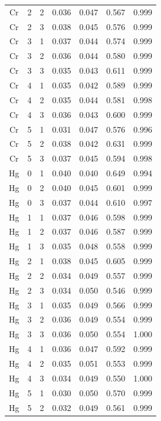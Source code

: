 \documentclass[ms, hidelinks]{uncgdissertationexp}
\theoremstyle{plain}
\theoremstyle{definition}
\theoremstyle{remark}
\begin{document}
\begin{longtable}{ccccccc}
Cr & 2 & 2 & 0.036 & 0.047 & 0.567 & 0.999\\
\rowcolor{gray!6}  Cr & 2 & 3 & 0.038 & 0.045 & 0.576 & 0.999\\
Cr & 3 & 1 & 0.037 & 0.044 & 0.574 & 0.999\\
\rowcolor{gray!6}  Cr & 3 & 2 & 0.036 & 0.044 & 0.580 & 0.999\\
Cr & 3 & 3 & 0.035 & 0.043 & 0.611 & 0.999\\
\rowcolor{gray!6}  Cr & 4 & 1 & 0.035 & 0.042 & 0.589 & 0.999\\
Cr & 4 & 2 & 0.035 & 0.044 & 0.581 & 0.998\\
\rowcolor{gray!6}  Cr & 4 & 3 & 0.036 & 0.043 & 0.600 & 0.999\\
Cr & 5 & 1 & 0.031 & 0.047 & 0.576 & 0.996\\
\rowcolor{gray!6}  Cr & 5 & 2 & 0.038 & 0.042 & 0.631 & 0.999\\
Cr & 5 & 3 & 0.037 & 0.045 & 0.594 & 0.998\\
\rowcolor{gray!6}  Hg & 0 & 1 & 0.040 & 0.040 & 0.649 & 0.994\\
Hg & 0 & 2 & 0.040 & 0.045 & 0.601 & 0.999\\
\rowcolor{gray!6}  Hg & 0 & 3 & 0.037 & 0.044 & 0.610 & 0.997\\
Hg & 1 & 1 & 0.037 & 0.046 & 0.598 & 0.999\\
\rowcolor{gray!6}  Hg & 1 & 2 & 0.037 & 0.046 & 0.587 & 0.999\\
Hg & 1 & 3 & 0.035 & 0.048 & 0.558 & 0.999\\
\rowcolor{gray!6}  Hg & 2 & 1 & 0.038 & 0.045 & 0.605 & 0.999\\
Hg & 2 & 2 & 0.034 & 0.049 & 0.557 & 0.999\\
\rowcolor{gray!6}  Hg & 2 & 3 & 0.034 & 0.050 & 0.546 & 0.999\\
Hg & 3 & 1 & 0.035 & 0.049 & 0.566 & 0.999\\
\rowcolor{gray!6}  Hg & 3 & 2 & 0.036 & 0.049 & 0.554 & 0.999\\
Hg & 3 & 3 & 0.036 & 0.050 & 0.554 & 1.000\\
\rowcolor{gray!6}  Hg & 4 & 1 & 0.036 & 0.047 & 0.592 & 0.999\\
Hg & 4 & 2 & 0.035 & 0.051 & 0.553 & 0.999\\
\rowcolor{gray!6}  Hg & 4 & 3 & 0.034 & 0.049 & 0.550 & 1.000\\
Hg & 5 & 1 & 0.030 & 0.050 & 0.570 & 0.999\\
\rowcolor{gray!6}  Hg & 5 & 2 & 0.032 & 0.049 & 0.561 & 0.999\\

\end{longtable}
\end{document}
